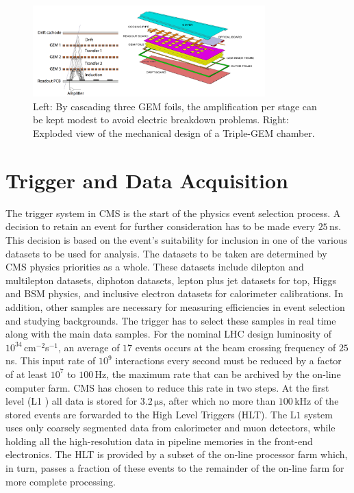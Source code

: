 \begin{figure}[h!]
\centering
\includegraphics[width=0.8\textwidth]{Images/TripleGEM}
\caption{Left: By cascading three GEM foils, the amplification per stage can be kept modest to avoid electric breakdown problems. Right: Exploded view of the mechanical design of a Triple-GEM chamber.}
\label{TripleGEM}
\end{figure}
 
\section{Trigger and Data Acquisition}\label{sec:trig}
The trigger system in CMS is the start of the physics event selection process. A decision to retain an event for further consideration has to be made every $25 \,$ns. This decision is based on the event's suitability for inclusion in one of the various datasets to be used for analysis. The datasets to be taken are determined by CMS physics priorities as a whole. These datasets include dilepton and multilepton datasets, diphoton datasets, lepton plus jet datasets for top, Higgs and BSM physics, and inclusive electron datasets for calorimeter calibrations. In addition, other samples are necessary for measuring efficiencies in event selection and studying backgrounds. The trigger has to select these samples in real time along with the main data samples.
For the nominal LHC design luminosity of $10^{34} \,$cm$^{-2}$s$^{-1}$, an average of $17$ events occurs at the beam crossing frequency of $25$ ns. This input rate of $10^9$ interactions every second must be reduced by a factor of at least $10^7$ to $100 \,$Hz, the maximum rate that can be archived by the on-line computer farm. CMS has chosen to reduce
this rate in two steps. At the first level (L1 \cite{L1}) all data is stored for $3.2 \, \mathrm{\mu s}$, after which no more than $100 $\,kHz of the stored events are forwarded to the High Level Triggers (HLT). The L$1$ system uses only coarsely segmented data from calorimeter and muon detectors, while holding all the high-resolution data in pipeline memories in the front-end electronics. The HLT \cite{HLT} is provided by a subset of the on-line processor farm which, in turn, passes a fraction of these events to the remainder of the on-line farm for more complete processing.

